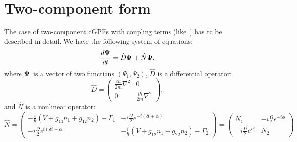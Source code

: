 \section{Two-component form}

The case of two-component cGPEs with coupling terms (like~)
has to be described in detail.
We have the following system of equations:
\begin{equation}
\label{eqn:split-step:two-comp-eqn}
	\frac{d \boldsymbol{\Psi}}{dt} = \hat{D} \boldsymbol{\Psi} + \hat{N} \boldsymbol{\Psi},
\end{equation}
where $\boldsymbol{\Psi}$ is a vector of two functions $(\Psi_1, \Psi_2)$,
$\hat{D}$ is a differential operator:
\[
	\hat{D} = \begin{pmatrix}
		\frac{i \hbar}{2 m} \nabla^2 & 0 \\
		0 & \frac{i \hbar}{2 m} \nabla^2
	\end{pmatrix},
\]
and $\hat{N}$ is a nonlinear operator:
\[
	\hat{N} = \begin{pmatrix}
		-\frac{i}{\hbar} \left( V + g_{11} n_1 + g_{12} n_2 \right) - \Gamma_1 &
		-i \frac{\Omega}{2} e^{-i (\delta t + \alpha)} \\
		-i \frac{\Omega}{2} e^{i (\delta t + \alpha)} &
		-\frac{i}{\hbar} \left( V + g_{12} n_1 + g_{22} n_2 \right) - \Gamma_2
	\end{pmatrix}
	= \begin{pmatrix}
		N_1 & -i \frac{\Omega}{2} e^{-i \phi} \\ - i \frac{\Omega}{2} e^{i \phi} & N_2
	\end{pmatrix}
\]

